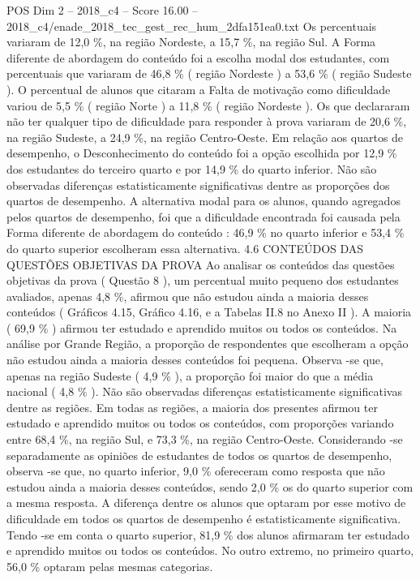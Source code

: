 \begin{textsample}{POS Dim 2 – 2018\_c4 – Score 16.00 – 2018\_c4/enade\_2018\_tec\_gest\_rec\_hum\_2dfa151ea0.txt}
Os percentuais variaram de 12,0 \%, na região Nordeste, a 15,7 \%, na região Sul.
A Forma diferente de abordagem do conteúdo foi a escolha modal dos estudantes, com percentuais que variaram de 46,8 \% ( região Nordeste ) a 53,6 \% ( região Sudeste ).
O percentual de alunos que citaram a Falta de motivação como dificuldade variou de 5,5 \% ( região Norte ) a 11,8 \% ( região Nordeste ).
Os que declararam não ter qualquer tipo de dificuldade para responder à prova variaram de 20,6 \%, na região Sudeste, a 24,9 \%, na região Centro-Oeste.
Em relação aos quartos de desempenho, o Desconhecimento do conteúdo foi a opção escolhida por 12,9 \% dos estudantes do terceiro quarto e por 14,9 \% do quarto inferior.
Não são observadas diferenças estatisticamente significativas dentre as proporções dos quartos de desempenho.
A alternativa modal para os alunos, quando agregados pelos quartos de desempenho, foi que a dificuldade encontrada foi causada pela Forma diferente de abordagem do conteúdo : 46,9 \% no quarto inferior e 53,4 \% do quarto superior escolheram essa alternativa. 4.6 CONTEÚDOS DAS QUESTÕES OBJETIVAS DA PROVA Ao analisar os conteúdos das questões objetivas da prova ( Questão 8 ), um percentual muito pequeno dos estudantes avaliados, apenas 4,8 \%, afirmou que não estudou ainda a maioria desses conteúdos ( Gráficos 4.15, Gráfico 4.16, e a Tabelas II.8 no Anexo II ).
A maioria ( 69,9 \% ) afirmou ter estudado e aprendido muitos ou todos os conteúdos.
Na análise por Grande Região, a proporção de respondentes que escolheram a opção não estudou ainda a maioria desses conteúdos foi pequena.
Observa -se que, apenas na região Sudeste ( 4,9 \% ), a proporção foi maior do que a média nacional ( 4,8 \% ).
Não são observadas diferenças estatisticamente significativas dentre as regiões.
Em todas as regiões, a maioria dos presentes afirmou ter estudado e aprendido muitos ou todos os conteúdos, com proporções variando entre 68,4 \%, na região Sul, e 73,3 \%, na região Centro-Oeste.
Considerando -se separadamente as opiniões de estudantes de todos os quartos de desempenho, observa -se que, no quarto inferior, 9,0 \% ofereceram como resposta que não estudou ainda a maioria desses conteúdos, sendo 2,0 \% os do quarto superior com a mesma resposta.
A diferença dentre os alunos que optaram por esse motivo de dificuldade em todos os quartos de desempenho é estatisticamente significativa.
Tendo -se em conta o quarto superior, 81,9 \% dos alunos afirmaram ter estudado e aprendido muitos ou todos os conteúdos.
No outro extremo, no primeiro quarto, 56,0 \% optaram pelas mesmas categorias.

\end{textsample}
